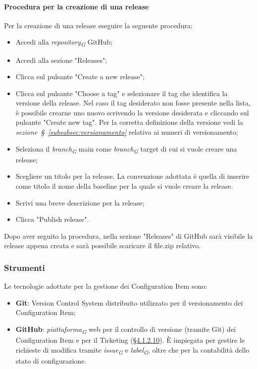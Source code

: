 \paragraph{Procedura per la creazione di una release}
Per la creazione di una release eseguire la seguente procedura:
\begin{itemize}
    \item Accedi alla \textit{repository}\textsubscript{\textit{G}} GitHub;
    \item Accedi alla sezione "Releases";
    \item Clicca sul pulsante "Create a new release";
    \item Clicca sul pulsante "Choose a tag" e selezionare il tag che identifica la versione della release. Nel caso il tag desiderato non fosse presente nella lista, è possibile crearne uno nuovo scrivendo la versione desiderata e cliccando sul pulsante "Create new tag". Per la corretta definizione della versione vedi la \textit{sezione~\S~\ref{subsubsec:versionamento}} relativa ai numeri di versionamento;
    \item Seleziona il \textit{branch}\textsubscript{\textit{G}} main come \textit{branch}\textsubscript{\textit{G}} target di cui si vuole creare una release;
    \item Scegliere un titolo per la release. La convenzione adottata è quella di inserire come titolo il nome della baseline per la quale si vuole creare la release.
    \item Scrivi una breve descrizione per la release;
    \item Clicca "Publish release".
\end{itemize}

Dopo aver seguito la procedura, nella sezione "Releases" di GitHub sarà visibile la release appena creata e sarà possibile scaricare il file.zip relativo.

\subsubsection{Strumenti}
Le tecnologie adottate per la gestione dei Configuration Item sono:
\begin{itemize}
    \item \textbf{Git}: Version Control System distribuito utilizzato per il versionamento dei Configuration Item;
    \item \textbf{GitHub}: \textit{piattaforma}\textsubscript{\textit{G}} web per il controllo di versione (tramite Git) dei Configuration Item e per il Ticketing (\hyperlink{par:ticketing}{\S 4.1.2.10}). È impiegata per gestire le richieste di modifica tramite \textit{issue}\textsubscript{\textit{G}} e \textit{label}\textsubscript{\textit{G}}, oltre che per la contabilità dello stato di configurazione.
\end{itemize}

